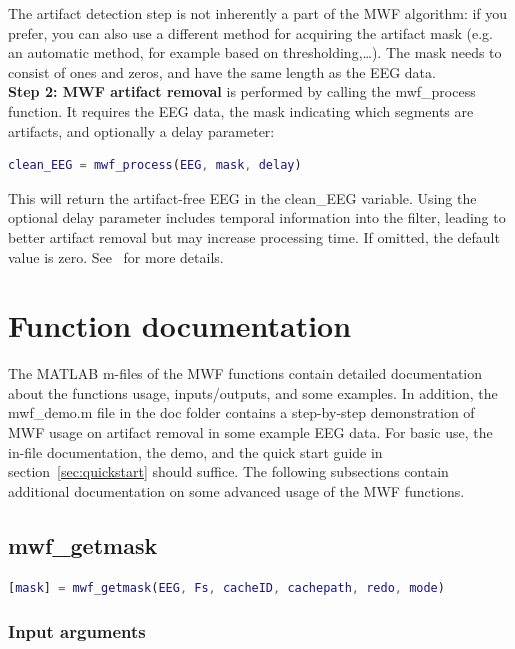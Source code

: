 \documentclass[11pt]{article}
\begin{document}
The artifact detection step is not inherently a part of the MWF algorithm: if you prefer, you can also use a different method for acquiring the artifact mask (e.g. an automatic method, for example based on thresholding,\ldots). The mask needs to consist of ones and zeros, and have the same length as the EEG data.
\\

\textbf{Step 2: MWF artifact removal} is performed by calling the mwf\_process function. It requires the EEG data, the mask indicating which segments are artifacts, and optionally a delay parameter:

\begin{lstlisting}[frame=single, language=matlab]
    clean_EEG = mwf_process(EEG, mask, delay)
\end{lstlisting}

This will return the artifact-free EEG in the clean\_EEG variable. Using the optional delay parameter includes temporal information into the filter, leading to better artifact removal but may increase processing time. If omitted, the default value is zero. See~\cite{somers2018generic} for more details.

\section{Function documentation}

The MATLAB m-files of the MWF functions contain detailed documentation about the functions usage, inputs/outputs, and some examples. In addition, the mwf\_demo.m file in the doc folder contains a step-by-step demonstration of MWF usage on artifact removal in some example EEG data. For basic use, the in-file documentation, the demo, and the quick start guide in section~\ref{sec:quickstart} should suffice. The following subsections contain additional documentation on some advanced usage of the MWF functions.

\subsection{mwf\_getmask}

\begin{lstlisting}[frame=single, language=matlab]
[mask] = mwf_getmask(EEG, Fs, cacheID, cachepath, redo, mode)
\end{lstlisting}

\subsubsection{Input arguments}
\end{document}

